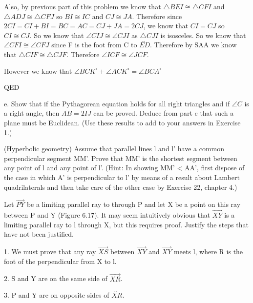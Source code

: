 \documentclass[12pt,letterpaper]{article}
\newcommand{\QED}{\begin{flushright}QED\end{flushright}}
\newcommand{\prob}[1]{\newpage\noindent {\bf #1}}
\begin{document}
Also, by previous part of this problem we know that $\triangle BEI \cong \triangle CFI$ and $\triangle ADJ \cong \triangle CFJ$ so $BI \cong IC$ and $CJ \cong JA$.  Therefore since $2CI = CI + BI = BC = AC = CJ + JA = 2CJ$, we know that $CI = CJ$ so $CI \cong CJ$.  So we know that $\angle CIJ \cong \angle CJI$ as $\triangle CJI$ is isosceles. So we know that $\angle CFI \cong \angle CFJ$ since F is the foot from C to $\overleftrightarrow{ED}$.  Therefore by SAA we know that $\triangle CIF \cong \triangle CJF$. Therefore 
$\angle ICF \cong \angle JCF$. 

However we know that $\angle BCK^\circ + \angle ACK^\circ = \angle BCA^\circ$

\QED







\newpage 

e. Show that if the Pythagorean equation holds for all right triangles and if $\angle C$ is a right angle, then $\overline{AB} = 2\overline{IJ}$ can be proved.  Deduce from part c that such a plane must be Euclidean.  (Use these results to add to your answers in Exercise 1.)







\prob{3 }(Hyperbolic geometry)
Assume that parallel lines l and l' have a common perpendicular segment MM'.  Prove that MM'  is the shortest segment between any point of l and any point of l'.  (Hint: In showing MM' < AA', first dispose of the case in which A' is perpendicular to l' by means of a result about Lambert quadrilaterals and then take care of the other case by Exercise 22, chapter 4.)




\prob{6 }Let $\overrightarrow{PY}$ be a limiting parallel ray to  through P and let X be a point on this ray between P and Y (Figure 6.17).  It may seem intuitively obvious that $\overrightarrow{XY}$ is a limiting parallel ray to l through X, but this requires proof.  Justify the steps that have not been justified. 

1. We must prove that any ray $\overrightarrow{XS}$ between $\overrightarrow{XY}$ and $\overrightarrow{XY}$ meets l, where R is the foot of the perpendicular from X to l. 

2. S and Y are on the same side of $\overrightarrow{XR}$.  

3. P and Y are on opposite sides of $\overleftrightarrow{XR}$. 
\end{document}
